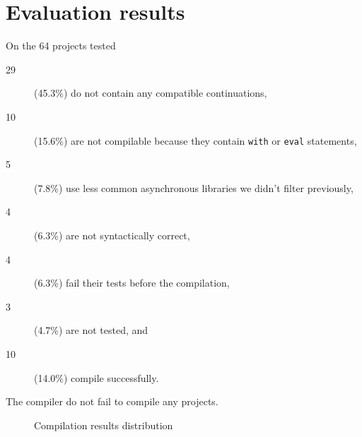 \appendix

\section{Evaluation results} \label{section:results}

On the 64 projects tested
\begin{description}
\item[29] (45.3\%) do not contain any compatible continuations,
\item[10] (15.6\%) are not compilable because they contain \texttt{with} or \texttt{eval} statements,
\item[5] (7.8\%) use less common asynchronous libraries we didn't filter previously,
\item[4] (6.3\%) are not syntactically correct,
\item[4] (6.3\%) fail their tests before the compilation,
\item[3] (4.7\%) are not tested, and
\item[10] (14.0\%) compile successfully.
\end{description}
The compiler do not fail to compile any projects.

\begin{figure}[h!]
\caption{Compilation results distribution}
\end{figure}

